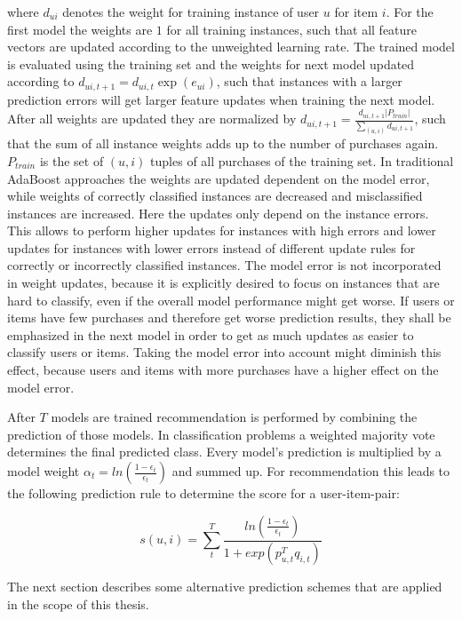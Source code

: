 \documentclass[10pt]{reportMaster}
\begin{document}
where $d_{ui}$ denotes the weight for training instance of user $u$ for item $i$.
For the first model the weights are $1$ for all training instances, such that all feature vectors are updated according to the unweighted learning rate.
The trained model is evaluated using the training set and the weights for next model updated according to $d_{ui,t+1} = d_{ui,t} \exp(e_{ui})$, such that instances with a larger prediction errors will get larger feature updates when training the next model.
After all weights are updated they are normalized by $d_{ui,t+1} = \frac{d_{ui,t+1} |P_{train}|}{\sum_{(u,i)}{d_{ui,t+1}}}$, such that the sum of all instance weights adds up to the number of purchases again.
$P_{train}$ is the set of $(u,i)$ tuples of all purchases of the training set.
In traditional AdaBoost approaches the weights are updated dependent on the model error, while weights of correctly classified instances are decreased and misclassified instances are increased.
Here the updates only depend on the instance errors.
This allows to perform higher updates for instances with high errors and lower updates for instances with lower errors instead of different update rules for correctly or incorrectly classified instances. 
The model error is not incorporated in weight updates, because it is explicitly desired to focus on instances that are hard to classify, even if the overall model performance might get worse.
If users or items have few purchases and therefore get worse prediction results, they shall be emphasized in the next model in order to get as much updates as easier to classify users or items.
Taking the model error into account might diminish this effect, because users and items with more purchases have a higher effect on the model error.

After $T$ models are trained recommendation is performed by combining the prediction of those models.
In classification problems a weighted majority vote determines the final predicted class.
Every model's prediction is multiplied by a model weight $\alpha_t = ln(\frac{1-\epsilon_t}{\epsilon_t})$ and summed up.
For recommendation this leads to the following prediction rule to determine the score for a user-item-pair:

\begin{equation}
	\label{eq:adaBoostPredRule}
	s(u,i) = \sum_t^T{\frac{ln(\frac{1 - \epsilon_t}{\epsilon_t})}{1 + exp(p_{u,t}^Tq_{i,t})}}
\end{equation}

The next section describes some alternative prediction schemes that are applied in the scope of this thesis.
\end{document}
